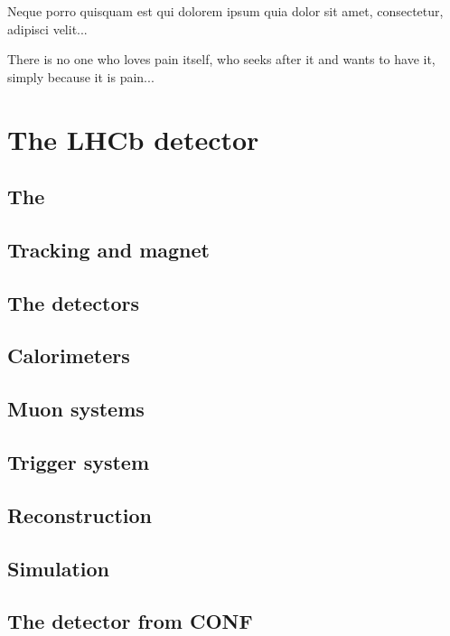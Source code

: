 \begin{savequote}[8cm]
\textlatin{Neque porro quisquam est qui dolorem ipsum quia dolor sit amet, consectetur, adipisci velit...}

There is no one who loves pain itself, who seeks after it and wants to have it, simply because it is pain...
\end{savequote}

\chapter{\label{ch:3-detector}The LHCb detector} 

\minitoc

\section{The \velo}

\section{Tracking and magnet}

\section{The \rich detectors}

\section{Calorimeters}

\section{Muon systems}

\section{Trigger system}

\section{Reconstruction}

\section{Simulation}

\section{The \lhcb detector from CONF}
\label{sec:detector}

